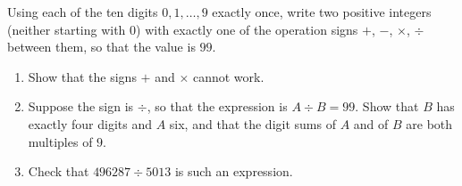 Using each of the ten digits $0,1,\ldots,9$ exactly once, write two positive integers (neither starting with $0$) with exactly one of the operation signs $+$, $-$, $\times$, $\div$ between them, so that the value is $99$.
\begin{enumerate}
\item[(a)] Show that the signs $+$ and $\times$ cannot work.
\item[(b)] Suppose the sign is $\div$, so that the expression is $A\div B=99$. Show that $B$ has exactly four digits and $A$ six, and that the digit sums of $A$ and of $B$ are both multiples of $9$.
\item[(c)] Check that $496287\div5013$ is such an expression.
\end{enumerate}
